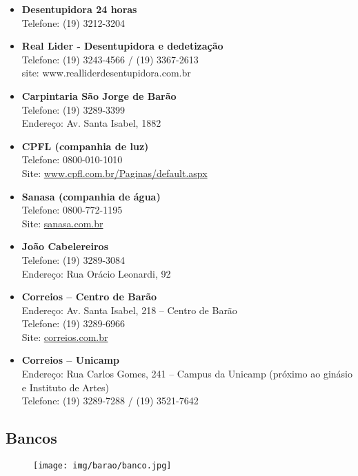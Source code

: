 \begin{itemize}
\item \textbf{Desentupidora 24 horas}
  \\Telefone: (19) 3212-3204

\item \textbf{Real Lider - Desentupidora e dedetização}
  \\Telefone: (19) 3243-4566 / (19) 3367-2613
  \\site: www.realliderdesentupidora.com.br

\item \textbf{Carpintaria São Jorge de Barão}
  \\Telefone: (19) 3289-3399
  \\Endereço: Av. Santa Isabel, 1882

\item \textbf{CPFL (companhia de luz)}
  \\Telefone: 0800-010-1010
  \\Site: \url{www.cpfl.com.br/Paginas/default.aspx}

\item \textbf{Sanasa (companhia de água)}
  \\Telefone: 0800-772-1195
  \\Site: \url{sanasa.com.br}

\item \textbf{João Cabelereiros}
  \\Telefone: (19) 3289-3084
  \\Endereço: Rua Orácio Leonardi, 92

\item \textbf{Correios -- Centro de Barão}
  \\Endereço: Av. Santa Isabel, 218 -- Centro de Barão
  \\Telefone: (19) 3289-6966
  \\Site: \url{correios.com.br}

\item \textbf{Correios -- Unicamp}
  \\Endereço: Rua Carlos Gomes, 241 -- Campus da Unicamp (próximo ao
  ginásio e Instituto de Artes)
  \\Telefone: (19) 3289-7288 / (19) 3521-7642
\end{itemize}

\subsection{Bancos}

\begin{figure}[h!]
    \centering
    \texttt{[image: img/barao/banco.jpg]}
\end{figure}


